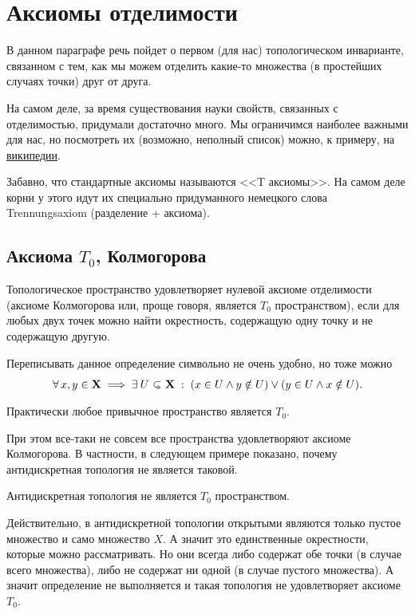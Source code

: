 \section{Аксиомы отделимости}
\begin{Intro}
    В данном параграфе речь пойдет о первом (для нас) топологическом инварианте, связанном с тем, как мы можем отделить какие-то множества (в простейших случаях точки) друг от друга.

    На самом деле, за время существования науки свойств, связанных с отделимостью, придумали достаточно много. Мы ограничимся наиболее важными для нас, но посмотреть их (возможно, неполный список) можно, к примеру, на \href{https://en.wikipedia.org/wiki/Separation_axiom#Main_definitions}{википедии}.
\end{Intro}

Забавно, что стандартные аксиомы называются <<T аксиомы>>. На самом деле корни у этого идут их специально придуманного немецкого слова Trennungsaxiom (разделение + аксиома). 

\subsection{Аксиома $T_0$, Колмогорова}
\begin{Def}
    Топологическое пространство \topX удовлетворяет нулевой аксиоме отделимости (аксиоме Колмогорова или, проще говоря, является $T_0$ пространством), если для любых двух точек можно найти окрестность, содержащую одну точку и не содержащую другую.

    Переписывать данное определение символьно не очень удобно, но тоже можно
    \[
    \forall x, y \in \X \implies \exists U\open \X  \st  (x \in U \wedge y \notin U) \vee (y \in U \wedge x \notin U).
    \] 
\end{Def}

\begin{Ex}
    Практически любое привычное пространство является $T_0$.
\end{Ex}
При этом все-таки не совсем все пространства удовлетворяют аксиоме Колмогорова. В частности, в следующем примере показано, почему антидискретная топология не является таковой.
\begin{Ex}
    Антидискретная топология не является $T_0$ пространством.

    Действительно, в антидискретной топологии открытыми являются только пустое множество и само множество $X$. А значит это единственные окрестности, которые можно рассматривать. Но они всегда либо содержат обе точки (в случае всего множества), либо не содержат ни одной (в случае пустого множества). А значит определение не выполняется и такая топология не удовлетворяет аксиоме $T_0$.
\end{Ex}


